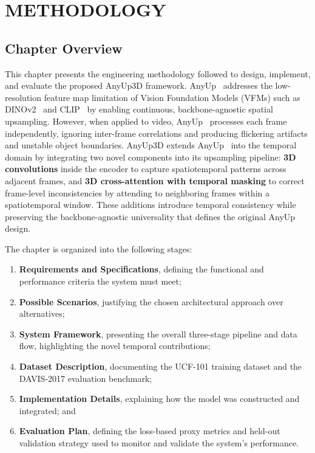 \chapter{METHODOLOGY}

\section{Chapter Overview}
This chapter presents the engineering methodology followed to design, implement, and
evaluate the proposed AnyUp3D framework. AnyUp~\cite{anyup} addresses the low-resolution
feature map limitation of Vision Foundation Models (VFMs) such as DINOv2~\cite{dinov2} and CLIP~\cite{radford2021clip}
by enabling continuous, backbone-agnostic spatial upsampling. However, when applied
to video, AnyUp~\cite{anyup} processes each frame independently, ignoring inter-frame correlations
and producing flickering artifacts and unstable object boundaries. AnyUp3D extends
AnyUp~\cite{anyup} into the temporal domain by integrating two novel components into its upsampling
pipeline: \textbf{3D convolutions} inside the encoder to capture spatiotemporal patterns across
adjacent frames, and \textbf{3D cross-attention with temporal masking} to correct frame-level
inconsistencies by attending to neighboring frames within a spatiotemporal window. These additions introduce temporal
consistency while preserving the backbone-agnostic universality that defines the
original AnyUp~\cite{anyup} design.

The chapter is organized into the following stages:
\begin{enumerate}
    \item \textbf{Requirements and Specifications}, defining the functional and
    performance criteria the system must meet;
    \item \textbf{Possible Scenarios}, justifying the chosen architectural approach
    over alternatives;
    \item \textbf{System Framework}, presenting the overall three-stage pipeline and
    data flow, highlighting the novel temporal contributions;
    \item \textbf{Dataset Description}, documenting the UCF-101 training dataset
    and the DAVIS-2017 evaluation benchmark;
    \item \textbf{Implementation Details}, explaining how the model was constructed
    and integrated; and
    \item \textbf{Evaluation Plan}, defining the loss-based proxy metrics and
    held-out validation strategy used to monitor and validate the system's performance.
\end{enumerate}

